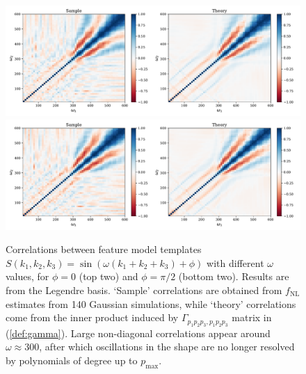 \begin{figure}[htbp!] 
	\centering    
	\includegraphics[width=\textwidth]{sine_template_correlations_new.pdf}
	\includegraphics[width=\textwidth]{cosine_template_correlations_new.pdf}
	\caption{Correlations between feature model templates $S(k_1,k_2,k_3)=\sin(\omega (k_1 + k_2 + k_3) + \phi)$ with different $\omega$ values, for $\phi = 0$ (top two) and $\phi = \pi/2$ (bottom two). Results are from the Legendre basis. `Sample' correlations are obtained from $f_\text{NL}$ estimates from 140 Gaussian simulations, while `theory' correlations come from the inner product induced by $\Gamma_{p_1 p_2 p_3, p_1 p_2 p_3}$ matrix in (\ref{def:gamma}). Large non-diagonal correlations appear around $\omega \approx 300$, after which oscillations in the shape are no longer resolved by polynomials of degree up to $p_\textrm{max}$.}
	\label{fig:feature_template_correlations}
\end{figure}

